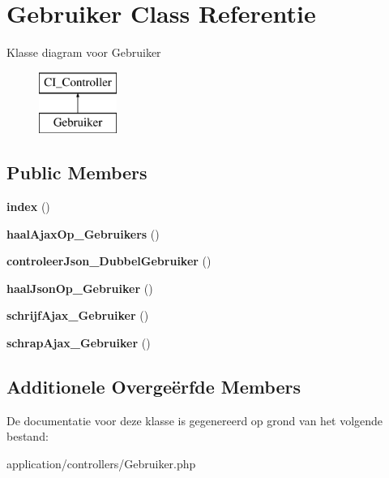 \hypertarget{class_gebruiker}{}\section{Gebruiker Class Referentie}
\label{class_gebruiker}
Klasse diagram voor Gebruiker\begin{figure}[H]
\begin{center}
\leavevmode
\includegraphics[height=2.000000cm]{class_gebruiker}
\end{center}
\end{figure}
\subsection*{Public Members}
\begin{DoxyCompactItemize}
\item 
\mbox{\label{class_gebruiker_a149eb92716c1084a935e04a8d95f7347}} 
{\bfseries index} ()
\item 
\mbox{\label{class_gebruiker_a8b748bc7ee2474d0d806bef26acd9966}} 
{\bfseries haal\+Ajax\+Op\+\_\+\+Gebruikers} ()
\item 
\mbox{\label{class_gebruiker_ae437af135c3d05a5f48071a1973cc075}} 
{\bfseries controleer\+Json\+\_\+\+Dubbel\+Gebruiker} ()
\item 
\mbox{\label{class_gebruiker_a31c5d89953b20dae4abbeab729dd7e4b}} 
{\bfseries haal\+Json\+Op\+\_\+\+Gebruiker} ()
\item 
\mbox{\label{class_gebruiker_aedc236e920979d3a740ada7fb2bef662}} 
{\bfseries schrijf\+Ajax\+\_\+\+Gebruiker} ()
\item 
\mbox{\label{class_gebruiker_aef43ccc80d6668b179057b29053b79e5}} 
{\bfseries schrap\+Ajax\+\_\+\+Gebruiker} ()
\end{DoxyCompactItemize}
\subsection*{Additionele Overge\"{e}rfde Members}


De documentatie voor deze klasse is gegenereerd op grond van het volgende bestand\+:\begin{DoxyCompactItemize}
\item 
application/controllers/Gebruiker.\+php\end{DoxyCompactItemize}
